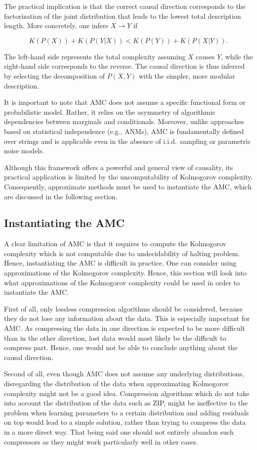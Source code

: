 \documentclass{article}
\begin{document}
The practical implication is that the correct causal direction corresponds to the factorization of the joint distribution that leads to the lowest total description length. More concretely, one infers $X \to Y$ if

$$ K(P(X)) + K(P(Y|X)) < K(P(Y)) + K(P(X|Y)). $$

The left-hand side represents the total complexity assuming $X$ causes $Y$, while the right-hand side corresponds to the reverse. The causal direction is thus inferred by selecting the decomposition of $P(X, Y)$ with the simpler, more modular description.

It is important to note that AMC does not assume a specific functional form or probabilistic model. Rather, it relies on the asymmetry of algorithmic dependencies between marginals and conditionals. Moreover, unlike approaches based on statistical independence (e.g., ANMs), AMC is fundamentally defined over strings and is applicable even in the absence of i.i.d.\ sampling or parametric noise models.

Although this framework offers a powerful and general view of causality, its practical application is limited by the uncomputability of Kolmogorov complexity. Consequently, approximate methods must be used to instantiate the AMC, which are discussed in the following section.

\subsection{Instantiating the AMC}
A clear limitation of AMC is that it requires to compute the Kolmogorov complexity which is not computable due to undecidability of halting problem. Hence, instantiating the AMC is difficult in practice. One can consider using approximations of the Kolmogorov complexity. Hence, this section will look into what approximations of the Kolmogorov complexity could be used in order to instantiate the AMC.

First of all, only lossless compression algorithms should be considered, because they do not lose any information about the data. This is especially important for AMC. As compressing the data in one direction is expected to be more difficult than in the other direction, lost data would most likely be the difficult to compress part. Hence, one would not be able to conclude anything about the causal direction.

Second of all, even though AMC does not assume any underlying distributions, disregarding the distribution of the data when approximating Kolmogorov complexity might not be a good idea. Compression algorithms which do not take into account the distribution of the data such as ZIP, might be ineffective to the problem when learning parameters to a certain distribution and adding residuals on top would lead to a simple solution, rather than trying to compress the data in a more direct way. That being said one should not entirely abandon such compressors as they might work particularly well in other cases.
\end{document}
